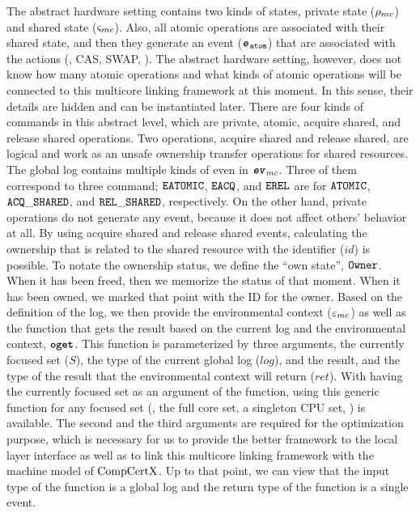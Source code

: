 The abstract hardware setting contains two kinds of states, private state (${\rho_{mc}}$) and shared state (${\varsigma_{mc}}$). 
Also, all atomic operations are associated with their shared state, and then they generate an event (${{\mathrm{\texttt{\textbf{\textit{e}}}}}_{{\mathrm{\texttt{atom}}}}}$) that 
are associated with the actions (\eg, CAS, SWAP, \etc).
The abstract hardware setting, however, 
does not know how many atomic operations and what kinds of atomic operations 
will be connected to this multicore linking framework at this moment.
In this sense, their details are hidden and can be instantiated later. 
There are four kinds of commands in this abstract level, 
which are private, atomic, acquire shared, and release shared operations. 
Two operations, acquire shared and release shared, are logical and work as an unsafe ownership transfer operations for shared resources. 
The global log contains multiple kinds of even in ${{\mathrm{\texttt{\textbf{\textit{ev}}}}}_{mc}}$. 
Three of them correspond to three command; ${{\mathrm{\texttt{EATOMIC}}}}$, ${{\mathrm{\texttt{EACQ}}}}$, and ${{\mathrm{\texttt{EREL}}}}$ are for ${{\mathrm{\texttt{ATOMIC}}}}$, ${{\mathrm{\texttt{ACQ}}}\_{\mathrm{\texttt{SHARED}}}}$, and ${{\mathrm{\texttt{REL}}}\_{\mathrm{\texttt{SHARED}}}}$, respectively. 
On the other hand, private operations do not generate any event, because it does not affect others' behavior at all. 
By using acquire shared and release shared events,
calculating the ownership that is related to the shared resource with the identifier ($id$) is possible. 
To notate the ownership status, we define the ``own state'', ${{\mathrm{\texttt{Owner}}}}$.
When it has been freed, then we memorize the status of that moment. 
When it has been owned, we marked that point with the ID for the owner. 
Based on the definition of the log, 
we then provide the environmental context (${\varepsilon_{mc}}$)
as well as the function that gets the result based on the current log and the environmental context, ${{\mathrm{\texttt{\textbf{oget}}}}}$.
This function is parameterized by three arguments, 
the currently focused set ($S$), the type of the current global log ($log$), and the result, and the type of 
the result that the environmental context will return ($ret$). 
With having the currently focused set as an argument of the function, using this generic function
for any focused set (\eg, the full core set, a singleton CPU set, \etc) is available. 
The second and the third arguments are required for the optimization purpose, which is 
necessary for us to provide the better framework to the local layer interface as 
well as to link this multicore linking framework with the machine model of $\mathrm{CompCertX}$. 
Up to that point, we can view that the input type of the function is a global log and the return type of the function is a single event.

